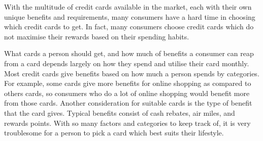 With the multitude of credit cards available in the market, each with their own unique benefits and requirements, many consumers have a hard time in choosing which credit cards to get. In fact, many consumers choose credit cards which do not maximise their rewards based on their spending habits.

What cards a person should get, and how much of benefits a consumer can reap from a card depends largely on how they spend and utilise their card monthly. Most credit cards give benefits based on how much a person spends by categories. For example, some cards give more benefits for online shopping as compared to others cards, so consumers who do a lot of online shopping would benefit more from those cards. Another consideration for suitable cards is the type of benefit that the card gives. Typical benefits consist of cash rebates, air miles, and rewards points. With so many factors and categories to keep track of, it is very troublesome for a person to pick a card which best suits their lifestyle.